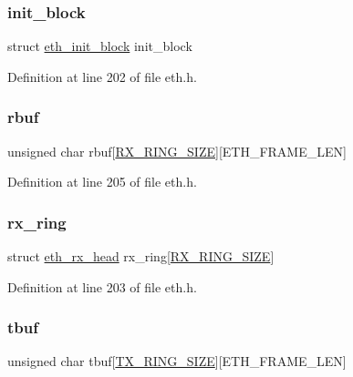 \subsubsection{\texorpdfstring{init\+\_\+block}{init\_block}}
{\footnotesize\ttfamily struct \hyperlink{structeth__init__block}{eth\+\_\+init\+\_\+block} init\+\_\+block}



Definition at line 202 of file eth.\+h.

\hypertarget{structeth__interface_a173aaee97f562414ca50c66cc4c2815c}{}\label{structeth__interface_a173aaee97f562414ca50c66cc4c2815c} 
\subsubsection{\texorpdfstring{rbuf}{rbuf}}
{\footnotesize\ttfamily unsigned char rbuf\mbox{[}\hyperlink{eth_8h_afcfb8ac36c733187de151348eb50ef01}{R\+X\+\_\+\+R\+I\+N\+G\+\_\+\+S\+I\+ZE}\mbox{]}\mbox{[}E\+T\+H\+\_\+\+F\+R\+A\+M\+E\+\_\+\+L\+EN\mbox{]}}



Definition at line 205 of file eth.\+h.

\hypertarget{structeth__interface_aa1de1cea990454aa2d1932f1fd37cf8f}{}\label{structeth__interface_aa1de1cea990454aa2d1932f1fd37cf8f} 
\subsubsection{\texorpdfstring{rx\+\_\+ring}{rx\_ring}}
{\footnotesize\ttfamily struct \hyperlink{structeth__rx__head}{eth\+\_\+rx\+\_\+head} rx\+\_\+ring\mbox{[}\hyperlink{eth_8h_afcfb8ac36c733187de151348eb50ef01}{R\+X\+\_\+\+R\+I\+N\+G\+\_\+\+S\+I\+ZE}\mbox{]}}



Definition at line 203 of file eth.\+h.

\hypertarget{structeth__interface_a5e70e888f7bad2ab4eb06ee4784709e8}{}\label{structeth__interface_a5e70e888f7bad2ab4eb06ee4784709e8} 
\subsubsection{\texorpdfstring{tbuf}{tbuf}}
{\footnotesize\ttfamily unsigned char tbuf\mbox{[}\hyperlink{eth_8h_a530086d082c22e371518c2497c6d9014}{T\+X\+\_\+\+R\+I\+N\+G\+\_\+\+S\+I\+ZE}\mbox{]}\mbox{[}E\+T\+H\+\_\+\+F\+R\+A\+M\+E\+\_\+\+L\+EN\mbox{]}}




